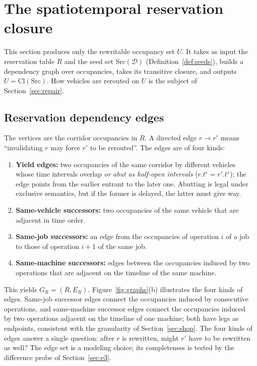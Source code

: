 \section{The spatiotemporal reservation closure}
\label{sec:strc}

This section produces only the rewritable occupancy set \(U\). It takes as input the reservation table \(R\) and the seed set \(\mathrm{Src}(\mathcal{D})\)
(Definition~\ref{def:seeds}), builds a dependency graph over occupancies, takes its transitive closure, and outputs \(U=\mathrm{Cl}(\mathrm{Src})\).
How vehicles are rerouted on \(U\) is the subject of Section~\ref{sec:repair}.

\subsection{Reservation dependency edges}
\label{sec:closure_def}

\begin{definition}
\label{def:dep}
The vertices are the corridor occupancies in \(R\). A directed edge \(r\to r'\) means ``invalidating \(r\) may force \(r'\) to be rerouted''. The edges are of four kinds:
\begin{enumerate}[leftmargin=1.4em,itemsep=0.15em]
\item \textbf{Yield edges:} two occupancies of the same corridor by different vehicles whose time intervals overlap \emph{or abut as half-open intervals}
(\(r.t^e=r'.t^s\)); the edge points from the earlier entrant to the later one. Abutting is legal under exclusive semantics, but if the former is delayed, the latter must give way.
\item \textbf{Same-vehicle successors:} two occupancies of the same vehicle that are adjacent in time order.
\item \textbf{Same-job successors:} an edge from the occupancies of operation \(i\) of a job to those of operation \(i+1\) of the same job.
\item \textbf{Same-machine successors:} edges between the occupancies induced by two operations that are adjacent on the timeline of the same machine.
\end{enumerate}
This yields \(G_R=(R,E_R)\).
Figure~\ref{fig:graphs}(b) illustrates the four kinds of edges. Same-job successor edges connect the occupancies induced by consecutive operations,
and same-machine successor edges connect the occupancies induced by two operations adjacent on the timeline of one machine;
both have legs as endpoints, consistent with the granularity of Section~\ref{sec:shop}.
The four kinds of edges answer a single question: after \(r\) is rewritten, might \(r'\) have to be rewritten as well?
The edge set is a modeling choice; its completeness is tested by the difference probe of Section~\ref{sec:e3}.
\end{definition}

